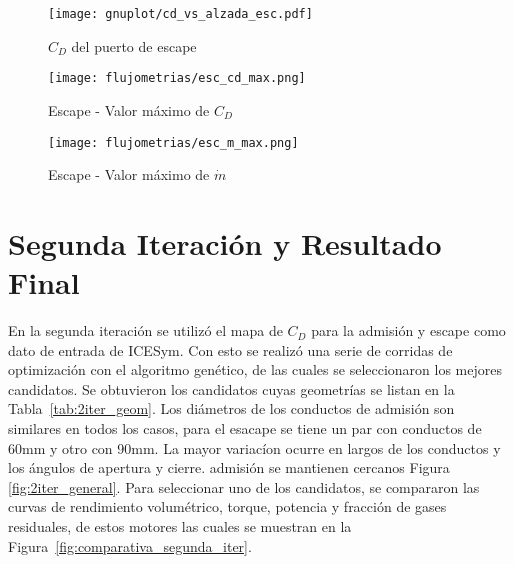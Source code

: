 \begin{figure}[h]
    \centering
    \texttt{[image: gnuplot/cd\_vs\_alzada\_esc.pdf]}
    \caption{$C_{D}$ del puerto de escape}\label{fig:cd_escape}
\end{figure}


\begin{figure}[h]
    \centering
    \texttt{[image: flujometrias/esc\_cd\_max.png]}
    \caption{Escape - Valor máximo de $C_{D}$}\label{fig:esc_cd_max}
\end{figure}

\begin{figure}[h]
    \centering
    \texttt{[image: flujometrias/esc\_m\_max.png]}
    \caption{Escape - Valor máximo de $\dot{m}$}\label{fig:esc_m_max}
\end{figure}


\section{Segunda Iteración y Resultado Final}
%
En la segunda iteración se utilizó el mapa de $C_D$ para la admisión y escape
como dato de entrada de ICESym.
%
Con esto se realizó una serie de corridas de optimización con el algoritmo
genético, de las cuales se seleccionaron los mejores candidatos.
%
Se obtuvieron los candidatos cuyas geometrías se listan en la
Tabla~\ref{tab:2iter_geom}.
%
Los diámetros de los conductos de admisión son similares en todos los casos,
para el esacape se tiene un par con conductos de 60mm y otro con 90mm.
%
La mayor variacíon ocurre en largos de los conductos y los ángulos de apertura y
cierre.
%
admisión se mantienen cercanos Figura \ref{fig:2iter_general}.
%
Para seleccionar uno de los candidatos, se compararon las curvas de rendimiento
volumétrico, torque, potencia y fracción de gases residuales, de estos motores
las cuales se muestran en la Figura~\ref{fig:comparativa_segunda_iter}.

